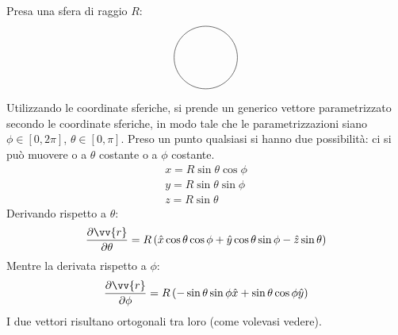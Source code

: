 \documentclass[a4paper, oneside]{article}
\begin{document}
\begin{example}
    Presa una sfera di raggio $R$:
    \begin{gather*}
        \begin{tikzpicture}
            \draw(0, 0) circle (1);
        \end{tikzpicture}
    \end{gather*}
    Utilizzando le coordinate sferiche, si prende un generico vettore
    parametrizzato secondo le coordinate sferiche, in modo tale che 
    le parametrizzazioni siano $\phi \in [0, 2\pi]$, $\theta \in [0, \pi]$.
    Preso un punto qualsiasi si hanno due possibilità: ci si può muovere o a 
    $\theta$ costante o a $\phi$ costante. 
    \begin{gather*}
        x = R\sin\theta \cos\phi \\
        y = R \sin\theta \sin\phi  \\
        z = R\sin\theta 
    \end{gather*}
    Derivando rispetto a $\theta$:
    \begin{gather*}
        \frac{\partial \vv{r} }{\partial \theta} = R\left(\hat{x}\cos\theta \cos\phi + \hat{y}\cos\theta\sin\phi - \hat{z}\sin\theta   \right) 
    \end{gather*}
    Mentre la derivata rispetto a $\phi$:
    \begin{gather*}
        \frac{\partial \vv{r} }{\partial \phi} = R\left(-\sin\theta \sin\phi \hat{x} + \sin\theta \cos\phi \hat{y}  \right) 
    \end{gather*}
    I due vettori risultano ortogonali tra loro (come volevasi vedere). 
\end{example}
\end{document}
